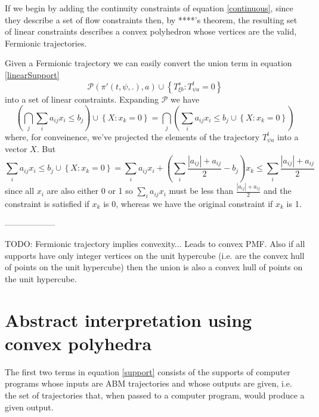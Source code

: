 \documentclass{article}
\begin{document}
If we begin by adding the continuity constraints of equation \ref{continuous}, since they describe a set of flow constraints then, by ****'s theorem, the resulting set of linear constraints describes a convex polyhedron whose vertices are the valid, Fermionic trajectories.


Given a Fermionic trajectory we can easily convert the union term in equation \ref{linearSupport} 
\[
\mathcal{P}(\pi'(t,\psi,.), a) \cup \left\{T^s_{\xi b}: T^t_{\psi a} = 0\right\}
\]
into a set of linear constraints. Expanding $\mathcal{P}$ we have
\[
\left(\bigcap_j \sum_i a_{ij}x_i \le b_j \right) \cup \left\{X: x_k = 0\right\} = \bigcap_j \left( \sum_i a_{ij}x_i \le b_j  \cup \left\{X: x_k = 0\right\}\right)
\]
where, for conveinence, we've projected the elements of the trajectory $T^t_{\psi a}$ into a vector $X$. But
\[
\sum_i a_{ij}x_i \le b_j  \cup \left\{X: x_k = 0\right\} = \sum_i a_{ij}x_i + \left(\sum_i \frac{|a_{ij}| + a_{ij}}{2} - b_j\right)x_k \le \sum_i \frac{|a_{ij}| + a_{ij}}{2} 
\]
since all $x_i$ are also either 0 or 1 so $\sum_i a_{ij}x_i$ must be less than $\frac{|a_{ij}| + a_{ij}}{2}$ and the constraint is satisfied if $x_k$ is 0, whereas we have the original constraint if $x_k$ is 1.

------------------

TODO: Fermionic trajectory implies convexity... Leads to convex PMF. Also if all supports have only integer vertices on the unit hypercube (i.e. are the convex hull of points on the unit hypercube) then the union is also a convex hull of points on the unit hypercube.

\section{Abstract interpretation using convex polyhedra}

The first two terms in equation \ref{support} consists of the supports of computer programs whose inputs are ABM trajectories and whose outputs are given, i.e. the set of trajectories that, when passed to a computer program, would produce a given output.
\end{document}
